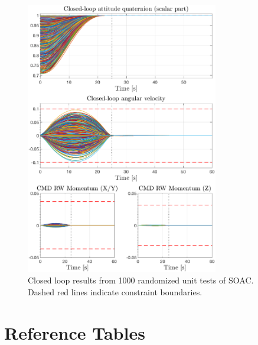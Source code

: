 \documentclass[10pt]{article}
\begin{document}
\begin{figure}
\centering
\includegraphics[width=0.75\textwidth]{figs/100219_mc_state_1000}
\caption{Closed loop results from 1000 randomized unit tests of SOAC. Dashed red lines indicate constraint boundaries.}
\label{fig:mc_results_state}
\end{figure}


\clearpage
\section*{Reference Tables}
\end{document}
